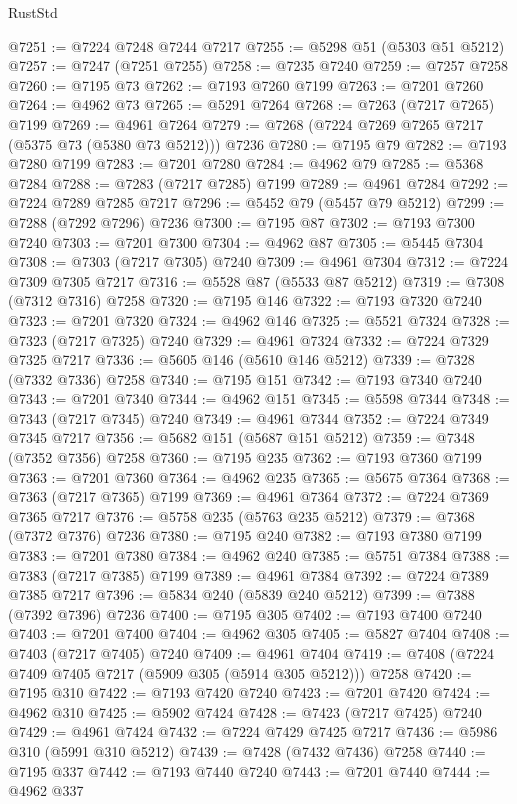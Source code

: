 \begin{lexlean}{RustStd}
\begin{coremodule}
@7251 := @7224 @7248 @7244 @7217
@7255 := @5298 @51 (@5303 @51 @5212)
@7257 := @7247 (@7251 @7255)
@7258 := @7235 @7240
@7259 := @7257 @7258
@7260 := @7195 @73
@7262 := @7193 @7260 @7199
@7263 := @7201 @7260
@7264 := @4962 @73
@7265 := @5291 @7264
@7268 := @7263 (@7217 @7265) @7199
@7269 := @4961 @7264
@7279 := @7268 (@7224 @7269 @7265 @7217 (@5375 @73 (@5380 @73 @5212))) @7236
@7280 := @7195 @79
@7282 := @7193 @7280 @7199
@7283 := @7201 @7280
@7284 := @4962 @79
@7285 := @5368 @7284
@7288 := @7283 (@7217 @7285) @7199
@7289 := @4961 @7284
@7292 := @7224 @7289 @7285 @7217
@7296 := @5452 @79 (@5457 @79 @5212)
@7299 := @7288 (@7292 @7296) @7236
@7300 := @7195 @87
@7302 := @7193 @7300 @7240
@7303 := @7201 @7300
@7304 := @4962 @87
@7305 := @5445 @7304
@7308 := @7303 (@7217 @7305) @7240
@7309 := @4961 @7304
@7312 := @7224 @7309 @7305 @7217
@7316 := @5528 @87 (@5533 @87 @5212)
@7319 := @7308 (@7312 @7316) @7258
@7320 := @7195 @146
@7322 := @7193 @7320 @7240
@7323 := @7201 @7320
@7324 := @4962 @146
@7325 := @5521 @7324
@7328 := @7323 (@7217 @7325) @7240
@7329 := @4961 @7324
@7332 := @7224 @7329 @7325 @7217
@7336 := @5605 @146 (@5610 @146 @5212)
@7339 := @7328 (@7332 @7336) @7258
@7340 := @7195 @151
@7342 := @7193 @7340 @7240
@7343 := @7201 @7340
@7344 := @4962 @151
@7345 := @5598 @7344
@7348 := @7343 (@7217 @7345) @7240
@7349 := @4961 @7344
@7352 := @7224 @7349 @7345 @7217
@7356 := @5682 @151 (@5687 @151 @5212)
@7359 := @7348 (@7352 @7356) @7258
@7360 := @7195 @235
@7362 := @7193 @7360 @7199
@7363 := @7201 @7360
@7364 := @4962 @235
@7365 := @5675 @7364
@7368 := @7363 (@7217 @7365) @7199
@7369 := @4961 @7364
@7372 := @7224 @7369 @7365 @7217
@7376 := @5758 @235 (@5763 @235 @5212)
@7379 := @7368 (@7372 @7376) @7236
@7380 := @7195 @240
@7382 := @7193 @7380 @7199
@7383 := @7201 @7380
@7384 := @4962 @240
@7385 := @5751 @7384
@7388 := @7383 (@7217 @7385) @7199
@7389 := @4961 @7384
@7392 := @7224 @7389 @7385 @7217
@7396 := @5834 @240 (@5839 @240 @5212)
@7399 := @7388 (@7392 @7396) @7236
@7400 := @7195 @305
@7402 := @7193 @7400 @7240
@7403 := @7201 @7400
@7404 := @4962 @305
@7405 := @5827 @7404
@7408 := @7403 (@7217 @7405) @7240
@7409 := @4961 @7404
@7419 := @7408 (@7224 @7409 @7405 @7217 (@5909 @305 (@5914 @305 @5212))) @7258
@7420 := @7195 @310
@7422 := @7193 @7420 @7240
@7423 := @7201 @7420
@7424 := @4962 @310
@7425 := @5902 @7424
@7428 := @7423 (@7217 @7425) @7240
@7429 := @4961 @7424
@7432 := @7224 @7429 @7425 @7217
@7436 := @5986 @310 (@5991 @310 @5212)
@7439 := @7428 (@7432 @7436) @7258
@7440 := @7195 @337
@7442 := @7193 @7440 @7240
@7443 := @7201 @7440
@7444 := @4962 @337

\end{coremodule}
\end{lexlean}
